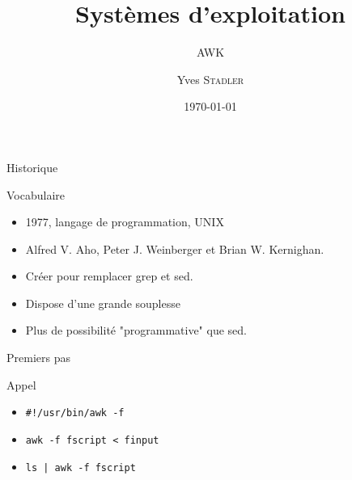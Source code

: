 
\title{Systèmes d'exploitation}
\subtitle{AWK}

\author{Yves \textsc{Stadler}}

\date{\today}




\begin{frame}
\titlepage
\end{frame}


\def\ftitle{Historique}
\begin{frame}[containsverbatim]{\ftitle}
\def\blocktitle{Vocabulaire}
\begin{block}{\blocktitle}
\begin{itemize}
\item 1977, langage de programmation, UNIX
\item Alfred V. Aho, Peter J. Weinberger et Brian W. Kernighan.
\item Créer pour remplacer grep et sed.
\item Dispose d'une grande souplesse
\item Plus de possibilité "programmative" que sed.
\end{itemize}
\end{block}
\end{frame}


\def\ftitle{Premiers pas}
\begin{frame}[containsverbatim]{\ftitle}
\def\blocktitle{Appel}
\begin{block}{\blocktitle}
\begin{itemize}
\item \verb|#!/usr/bin/awk -f|
\item \verb!awk -f fscript < finput!
\item \verb!ls | awk -f fscript!
\end{itemize}
\end{block}
\end{frame}

